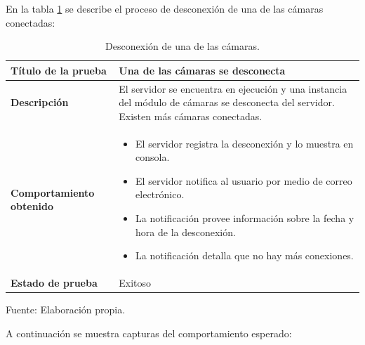 En la tabla \ref{n_cameras_one_desconnected} se describe el proceso de desconexión de una de las cámaras conectadas:\\

\begin{table}[H]
    \caption{Desconexión de una de las cámaras.}
    \begin{center}
        \begin{tabular}{|>{\centering}p{}|m{}<{\centering}|} 
            \hline
            \textbf{Título de la prueba} & \textbf{Una de las cámaras se desconecta} \\
            \hline
            \textbf{Descripción} & El servidor se encuentra en ejecución y una instancia del módulo de cámaras se desconecta del servidor. Existen más cámaras conectadas.\\
            \hline
            \textbf{Comportamiento obtenido} & 
            \begin{itemize}
                \item El servidor registra la desconexión y lo muestra en consola.
                \item El servidor notifica al usuario por medio de correo electrónico.
                \item La notificación provee información sobre la fecha y hora de la desconexión.
                \item La notificación detalla que no hay más conexiones.
            \end{itemize} \\ 
            \hline
            \textbf{Estado de prueba} & Exitoso \\
            \hline
        \end{tabular}
    \end{center}
    \begin{center}
        Fuente: Elaboración propia.
        \label{n_cameras_one_desconnected}
    \end{center}    
\end{table}

A continuación se muestra capturas del comportamiento esperado:

